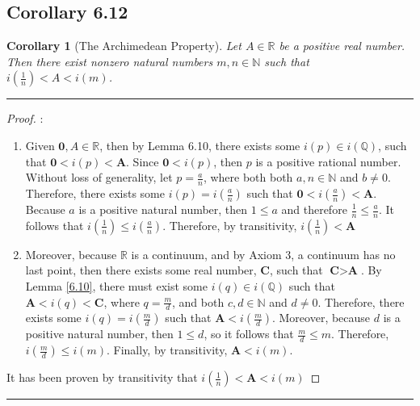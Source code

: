 \documentclass[openany, amssymb, psamsfonts]{amsart}
\newcommand{\bbN}{\mathbb{N}}
\newcommand{\bbQ}{\mathbb{Q}}
\newcommand{\bbR}{\mathbb{R}}
\newtheorem{cor}{Corollary}[section]
\theoremstyle{definition}
\numberwithin{equation}{section}
\begin{document}
\subsection*{Corollary 6.12}
\begin{cor}[The Archimedean Property]
\label{6.12}
Let $A \in \bbR$ be a positive real number. Then there exist nonzero natural numbers $m, n \in \bbN$ such that \newline $i(\frac{1}{n}) < A <i(m)$.
\end{cor}
\vspace{4pt}     \hrule   \vspace{4pt} \begin{proof}:\\
\begin{enumerate}[1]
\item Given $\textbf{0},A \in \bbR$, then by Lemma 6.10, there exists some $i(p)\in i(\bbQ)$, such that $\textbf{0} < \textit{i}(\textit{p}) < \textbf{A}$. Since $\textbf{0}<i(p)$, then $p$ is a positive rational number. Without loss of generality, let $p= \frac{a}{n}$, where both both $a,n \in \bbN$ and $b\neq 0$. Therefore, there exists some $i(p)= i(\frac{a}{n})$ such that $\textbf{0} < \textit{i}(\frac{a}{n})<\textbf{A}$. Because $a$ is a positive natural number, then $1\leq a$ and therefore $\frac{1}{n}\leq \frac{a}{n}$. It follows that $\textit{i}(\frac{1}{n}) \leq \textit{i}(\frac{a}{n})$. Therefore, by transitivity, $\textit{i}(\frac{1}{n}) < \textbf{A}$
\item Moreover, because $\bbR$ is a continuum, and by Axiom 3, a continuum has no last point, then there exists some real number, $\textbf{C}$, such that $\textbf{C} > \textbf{A}$. By Lemma \ref{6.10}, there must exist some $i(q)\in i(\bbQ)$ such that $\textbf{A}<\textit{i}(q) < \textbf{C}$, where $q= \frac{m}{d}$, and both $c,d \in \bbN$ and $d\neq 0$. Therefore, there exists some $i(q) = i(\frac{m}{d})$ such that $\textbf{A}<i(\frac{m}{d})$. Moreover, because $d$ is a positive natural number, then $1\leq d$, so it follows that $\frac{m}{d} \leq m$. Therefore, $\textit{i}(\frac{m}{d}) \leq \textit{i}(m)$. Finally, by transitivity, $\textbf{A}<\textit{i}(m)$.
\end{enumerate}
It has been proven by transitivity that $\textit{i}(\frac{1}{n}) < \textbf{A} < \textit{i}(m)$
\end{proof}\vspace{4pt}     \hrule   \vspace{4pt}
\end{document}
